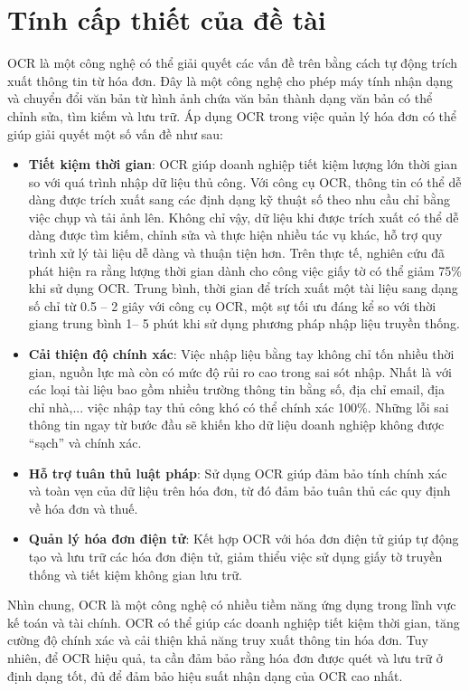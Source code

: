 \section{Tính cấp thiết của đề tài}
OCR là một công nghệ có thể giải quyết các vấn đề trên bằng cách tự động trích xuất thông tin từ hóa đơn. Đây là một công nghệ cho phép máy tính nhận dạng và chuyển đổi văn bản từ hình ảnh chứa văn bản thành dạng văn bản có thể chỉnh sửa, tìm kiếm và lưu trữ. Áp dụng OCR trong việc quản lý hóa đơn có thể giúp giải quyết một số vấn đề như sau:
\begin{itemize}
    \item \textbf{Tiết kiệm thời gian}: OCR giúp doanh nghiệp tiết kiệm lượng lớn thời gian so với quá trình nhập dữ liệu thủ công. Với công cụ OCR, thông tin có thể dễ dàng được trích xuất sang các định dạng kỹ thuật số theo nhu cầu chỉ bằng việc chụp và tải ảnh lên. Không chỉ vậy, dữ liệu khi được trích xuất có thể dễ dàng được tìm kiếm, chỉnh sửa và thực hiện nhiều tác vụ khác, hỗ trợ quy trình xử lý tài liệu dễ dàng và thuận tiện hơn. Trên thực tế, nghiên cứu đã phát hiện ra rằng lượng thời gian dành cho công việc giấy tờ có thể giảm 75\% khi sử dụng OCR. Trung bình, thời gian để trích xuất một tài liệu sang dạng số chỉ từ 0.5 – 2 giây với công cụ OCR, một sự tối ưu đáng kể so với thời giang trung bình 1– 5 phút khi sử dụng phương pháp nhập liệu truyền thống. \cite{fptai}
    \item \textbf{Cải thiện độ chính xác}: Việc nhập liệu bằng tay không chỉ tốn nhiều thời gian, nguồn lực mà còn có mức độ rủi ro cao trong sai sót nhập. Nhất là với các loại tài liệu bao gồm nhiều trường thông tin bằng số, địa chỉ email, địa chỉ nhà,... việc nhập tay thủ công khó có thể chính xác 100\%. Những lỗi sai thông tin ngay từ bước đầu sẽ khiến kho dữ liệu doanh nghiệp không được “sạch” và chính xác. 
    \item \textbf{Hỗ trợ tuân thủ luật pháp}: Sử dụng OCR giúp đảm bảo tính chính xác và toàn vẹn của dữ liệu trên hóa đơn, từ đó đảm bảo tuân thủ các quy định về hóa đơn và thuế.
    \item \textbf{Quản lý hóa đơn điện tử}: Kết hợp OCR với hóa đơn điện tử giúp tự động tạo và lưu trữ các hóa đơn điện tử, giảm thiểu việc sử dụng giấy tờ truyền thống và tiết kiệm không gian lưu trữ.
\end{itemize}

Nhìn chung, OCR là một công nghệ có nhiều tiềm năng ứng dụng trong lĩnh vực kế toán và tài chính. OCR có thể giúp các doanh nghiệp tiết kiệm thời gian, tăng cường độ chính xác và cải thiện khả năng truy xuất thông tin hóa đơn. Tuy nhiên, để OCR hiệu quả, ta cần đảm bảo rằng hóa đơn được quét và lưu trữ ở định dạng tốt, đủ để đảm bảo hiệu suất nhận dạng của OCR cao nhất. 

